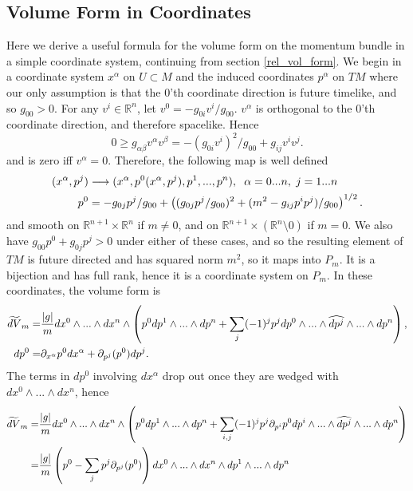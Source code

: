 \begin{subappendices}

\section{Volume Form in Coordinates}\label{coord_comp}
Here we derive a useful formula for the volume form on the momentum bundle in a simple coordinate system, continuing from section \ref{rel_vol_form}.  We begin in a coordinate system $x^\alpha$ on $U\subset M$ and the induced coordinates $p^\alpha$ on $TM$ where our only assumption is that the $0$'th coordinate direction is future timelike, and so $g_{00}>0$.  For any $v^i\in \mathbb{R}^n$, let $v^0=-g_{0i}v^i/g_{00}$.  $v^\alpha$ is orthogonal to the $0$'th coordinate direction, and therefore spacelike. Hence 
\begin{equation}
0\geq g_{\alpha \beta}v^\alpha v^\beta=-(g_{0i}v^i)^2/g_{00}+g_{ij}v^iv^j.
\end{equation}
and is zero iff $v^\alpha=0$. Therefore, the following map is well defined
\begin{align}
(x^\alpha,p^j)&\longrightarrow (x^\alpha,p^0(x^\alpha,p^j),p^1,...,p^n),  \hspace{2mm} \alpha=0...n, \hspace{1mm} j=1...n \notag\\
 p^0&=-g_{0j}p^j/g_{00}+\left((g_{0j}p^j/g_{00})^2+(m^2-g_{ij}p^ip^j)/g_{00}\right)^{1/2}.
\end{align}
and smooth on $\mathbb{R}^{n+1}\times\mathbb{R}^n$ if $m\neq 0$, and on $\mathbb{R}^{n+1}\times\left(\mathbb{R}^n\setminus{0}\right)$ if $m=0$.  We also have $g_{00}p^0+g_{0j}p^j>0$ under either of these cases, and so the resulting element of $TM$ is future directed and has squared norm $m^2$, so it maps into $P_m$.  It is a bijection and has full rank, hence it is a coordinate system on $P_m$.  In these coordinates, the volume form is
\begin{align}
\widetilde{dV}_m=&\frac{|g|}{m}dx^0\wedge...\wedge dx^n\wedge\left(p^0dp^1\wedge...\wedge dp^n+\sum_j (-1)^j p^j dp^0\wedge...\wedge\widehat{dp^j}\wedge...\wedge dp^n\right),\\
dp^0=&\partial_{x^\alpha} p^0dx^\alpha+\partial_{p^j}(p^0) dp^j.\notag
\end{align}
The terms in $dp^0$ involving $dx^\alpha$ drop out once they are wedged with $dx^0\wedge...\wedge dx^n$, hence
\small
\begin{align}
\widetilde{dV}_m=&\frac{|g|}{m}dx^0\wedge...\wedge dx^n\wedge\left(p^0dp^1\wedge...\wedge dp^n+\sum_{i,j} (-1)^j p^j \partial_{p^i}p^0 dp^i\wedge...\wedge\widehat{dp^j}\wedge...\wedge dp^n\right)\notag\\
=&\frac{|g|}{m}\left(p^0-\sum_{j}p^j \partial_{p^j}(p^0) \right)dx^0\wedge...\wedge dx^n\wedge dp^1\wedge...\wedge dp^n\notag
\end{align}
\normalsize


\end{subappendices}
